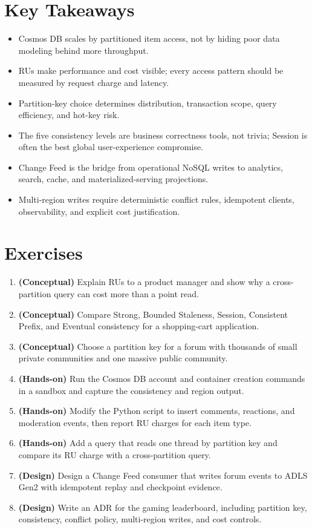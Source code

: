 \section*{Key Takeaways}
\begin{itemize}
    \item Cosmos DB scales by partitioned item access, not by hiding poor data modeling behind more throughput.
    \item RUs make performance and cost visible; every access pattern should be measured by request charge and latency.
    \item Partition-key choice determines distribution, transaction scope, query efficiency, and hot-key risk.
    \item The five consistency levels are business correctness tools, not trivia; Session is often the best global user-experience compromise.
    \item Change Feed is the bridge from operational NoSQL writes to analytics, search, cache, and materialized-serving projections.
    \item Multi-region writes require deterministic conflict rules, idempotent clients, observability, and explicit cost justification.
\end{itemize}

\section{Exercises}
\begin{enumerate}
    \item \textbf{(Conceptual)} Explain RUs to a product manager and show why a cross-partition query can cost more than a point read.
    \item \textbf{(Conceptual)} Compare Strong, Bounded Staleness, Session, Consistent Prefix, and Eventual consistency for a shopping-cart application.
    \item \textbf{(Conceptual)} Choose a partition key for a forum with thousands of small private communities and one massive public community.
    \item \textbf{(Hands-on)} Run the Cosmos DB account and container creation commands in a sandbox and capture the consistency and region output.
    \item \textbf{(Hands-on)} Modify the Python script to insert comments, reactions, and moderation events, then report RU charges for each item type.
    \item \textbf{(Hands-on)} Add a query that reads one thread by partition key and compare its RU charge with a cross-partition query.
    \item \textbf{(Design)} Design a Change Feed consumer that writes forum events to ADLS Gen2 with idempotent replay and checkpoint evidence.
    \item \textbf{(Design)} Write an ADR for the gaming leaderboard, including partition key, consistency, conflict policy, multi-region writes, and cost controls.
\end{enumerate}

